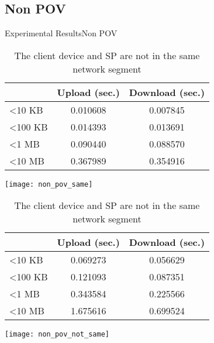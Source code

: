 \subsection{Non POV}
\begin{frame}{Experimental Results}{Non POV}
	\tiny
    \begin{table}[]
        \centering
        \begin{minipage}[c]{0.5\textwidth}
            \caption{The client device and SP are \newline in the same network segment}
            \begin{tabular}{lcc}
                                 & Upload (sec.) & Download (sec.) \\ \hline
                \textless 10 KB  & 0.010608      & 0.007845        \\ \hline
                \textless 100 KB & 0.014393      & 0.013691        \\ \hline
                \textless 1 MB   & 0.090440      & 0.088570        \\ \hline
                \textless 10 MB  & 0.367989      & 0.354916        \\ \hline
            \end{tabular}
            \begin{center}
                \texttt{[image: non\_pov\_same]}
            \end{center}
        \end{minipage}%
        \begin{minipage}[c]{0.5\textwidth}
            \caption{The client device and SP are \newline \alert{not} in the same network segment}
            \begin{tabular}{lcc}
                                 & Upload (sec.) & Download (sec.) \\ \hline
                \textless 10 KB  & 0.069273      & 0.056629        \\ \hline
                \textless 100 KB & 0.121093      & 0.087351        \\ \hline
                \textless 1 MB   & 0.343584      & 0.225566        \\ \hline
                \textless 10 MB  & 1.675616      & 0.699524        \\ \hline
            \end{tabular}
            \begin{center}
                \texttt{[image: non\_pov\_not\_same]}
            \end{center}
        \end{minipage}
    \end{table}
\end{frame}

